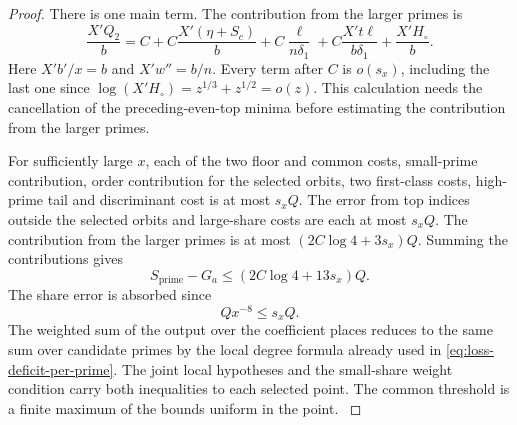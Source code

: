 \begin{proof}
There is one main term. The contribution from the larger primes is
\[
 \frac{X'Q_2}{b}= C+
 C\frac{X'(\eta+S_c)}{b}
 +C\frac{\ell}{n\delta_1}
 +C\frac{X't\ell}{b\delta_1}
 +\frac{X'H_\circ}{b}.
\]
Here \(X'b'/x=b\) and \(X'w''=b/n\). Every term after \(C\)
is \(o(s_x)\), including the last one since
\(\log(X'H_\circ)=z^{1/3}+z^{1/2}=o(z)\).
This calculation needs the cancellation of the preceding-even-top
minima before estimating the contribution from the larger primes.

For sufficiently large \(x\), each of the two floor and common costs,
small-prime contribution, order contribution for the selected orbits, two first-class costs, high-prime
tail and discriminant cost is at most \(s_xQ\). The error from top indices outside the selected orbits
and large-share costs are each at most \(s_xQ\). The contribution from the larger primes is at most \((2C\log4+3s_x)Q\).
Summing the contributions gives
\[
 S_{\mathrm{prime}}-G_a\le(2C\log4+13s_x)Q.
\]
The share error is absorbed since
\[
 Qx^{-8}\le s_xQ .
\] The weighted sum of the output over the coefficient
places reduces to the same sum over candidate primes by the local
degree formula already used in \eqref{eq:loss-deficit-per-prime}.
The joint local hypotheses and the small-share weight condition
carry both inequalities to each selected point. The common threshold
is a finite maximum of the bounds uniform in the point.
\label{cor:prime-class-loss-3}
\end{proof}
